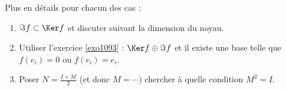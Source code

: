 {\begin{enumerate}
{Plus en détails pour chacun des cas :
\begin{enumerate}
  \item $\Im f \subset \Ker f$ et discuter suivant la dimension du noyau.
  \item Utiliser l'exercice \ref{exo1093} : $\Ker f \oplus \Im f$ et il existe une base telle que 
$f(e_i)=0$ ou $f(e_i)=e_i$.
  \item Poser $N= \frac{I+M}{2}$ (et donc $M=\cdots$) chercher à quelle condition $M^2=I$.
\end{enumerate}}
\end{enumerate}
}
